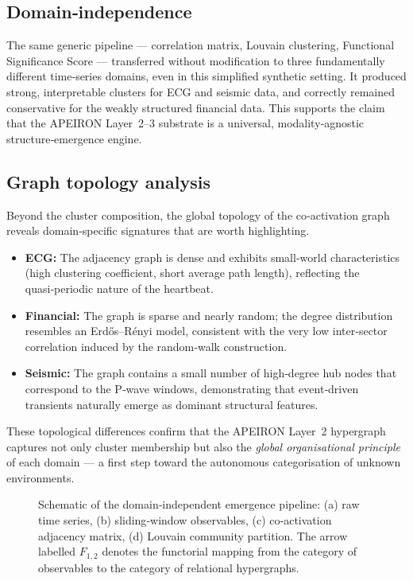 \subsection{Domain‑independence}
The same generic pipeline — correlation matrix, Louvain clustering, Functional Significance Score — transferred without modification to three fundamentally different time‑series domains, even in this simplified synthetic setting.
It produced strong, interpretable clusters for ECG and seismic data, and correctly remained conservative for the weakly structured financial data.
This supports the claim that the APEIRON Layer~2--3 substrate is a universal, modality‑agnostic structure‑emergence engine.

\subsection{Graph topology analysis}
Beyond the cluster composition, the global topology of the co‑activation graph reveals domain‑specific signatures that are worth highlighting.
\begin{itemize}
\item \textbf{ECG:} The adjacency graph is dense and exhibits small‑world characteristics (high clustering coefficient, short average path length), reflecting the quasi‑periodic nature of the heartbeat.
\item \textbf{Financial:} The graph is sparse and nearly random; the degree distribution resembles an Erdős–Rényi model, consistent with the very low inter‑sector correlation induced by the random‑walk construction.
\item \textbf{Seismic:} The graph contains a small number of high‑degree hub nodes that correspond to the P‑wave windows, demonstrating that event‑driven transients naturally emerge as dominant structural features.
\end{itemize}
These topological differences confirm that the APEIRON Layer~2 hypergraph captures not only cluster membership but also the \emph{global organisational principle} of each domain — a first step toward the autonomous categorisation of unknown environments.

\begin{figure}[htbp]
\centering

\caption{Schematic of the domain‑independent emergence pipeline: (a) raw time series, (b) sliding‑window observables, (c) co‑activation adjacency matrix, (d) Louvain community partition. The arrow labelled $F_{1,2}$ denotes the functorial mapping from the category of observables to the category of relational hypergraphs.}
\label{fig:schematic}
\end{figure}